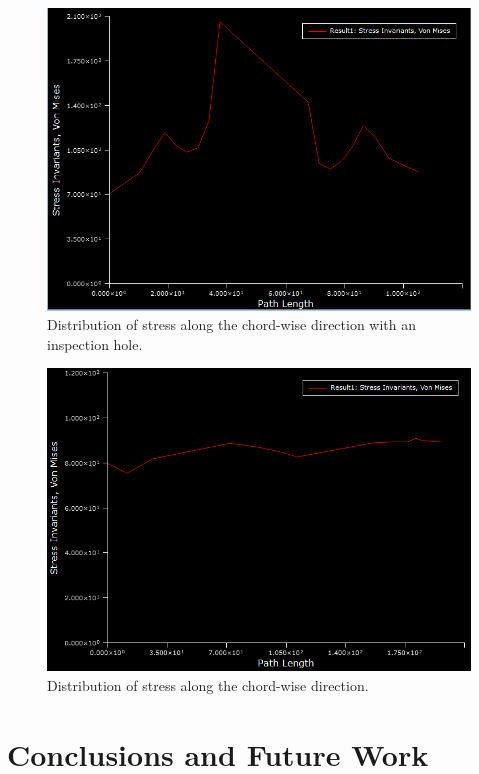 \documentclass[11pt,a4paper,oneside]{memoir}
\begin{document}
\begin{figure}[h]
    \centering
    \includegraphics[width = .8\textwidth]{figures/Path-length.png}
    \caption{Distribution of stress along the chord-wise direction with an inspection hole.}
    \label{fig:stress-along-chord-hole}
\end{figure}

\begin{figure}[h]
    \centering
    \includegraphics[width = .8\textwidth]{figures/Path-length-one.png}
    \caption{Distribution of stress along the chord-wise direction.}
    \label{fig:stress-along-chord}
\end{figure}



\chapter{Conclusions and Future Work}

\end{document}
